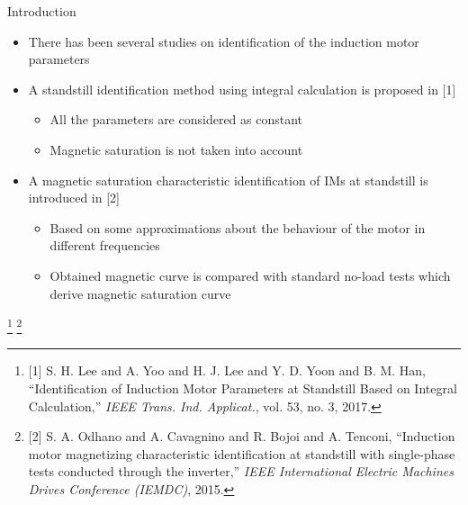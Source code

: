 \documentclass[11pt,aspectratio=169]{beamer}
\begin{document}
\begin{frame}{Introduction}
\begin{itemize}
    \item There has been several studies on identification of the induction motor parameters
    \item A standstill identification method using integral calculation is proposed in [1]
    \begin{itemize}
    \item All the parameters are considered as constant
    \item Magnetic saturation is not taken into account
    \end{itemize}
    \item  A magnetic saturation characteristic identification of IMs at standstill is introduced in [2]
    \begin{itemize}
     \item Based on some approximations about the behaviour of the motor in different frequencies
    \item Obtained magnetic curve is compared with standard no-load tests which derive magnetic saturation curve
    \end{itemize}
\end{itemize}
\footnote{[1] S. H. Lee and A. Yoo and H. J. Lee and Y. D. Yoon and B. M. Han, ``Identification of Induction Motor Parameters at Standstill Based on Integral Calculation,'' \emph{IEEE Trans. Ind. Applicat.}, vol. 53, no. 3, 2017.}
\footnote{[2] S. A. Odhano and A. Cavagnino and R. Bojoi and A. Tenconi, ``Induction motor magnetizing characteristic identification at standstill with single-phase tests conducted through the inverter,'' \emph{ IEEE International Electric Machines Drives Conference (IEMDC)}, 2015.}
\end{frame}
\end{document}
